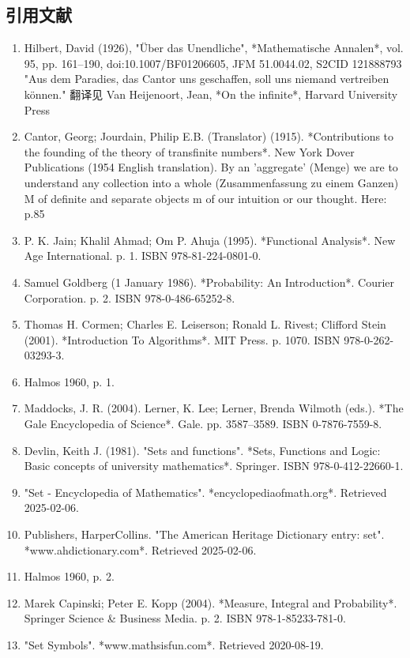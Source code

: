 \subsection{引用文献}
\begin{enumerate}
\item Hilbert, David (1926), "Über das Unendliche", *Mathematische Annalen*, vol. 95, pp. 161–190, doi:10.1007/BF01206605, JFM 51.0044.02, S2CID 121888793  
  "Aus dem Paradies, das Cantor uns geschaffen, soll uns niemand vertreiben können."  
  翻译见 Van Heijenoort, Jean, *On the infinite*, Harvard University Press
\item Cantor, Georg; Jourdain, Philip E.B. (Translator) (1915). *Contributions to the founding of the theory of transfinite numbers*. New York Dover Publications (1954 English translation). By an 'aggregate' (Menge) we are to understand any collection into a whole (Zusammenfassung zu einem Ganzen) M of definite and separate objects m of our intuition or our thought. Here: p.85  
\item P. K. Jain; Khalil Ahmad; Om P. Ahuja (1995). *Functional Analysis*. New Age International. p. 1. ISBN 978-81-224-0801-0.
\item Samuel Goldberg (1 January 1986). *Probability: An Introduction*. Courier Corporation. p. 2. ISBN 978-0-486-65252-8.  
\item Thomas H. Cormen; Charles E. Leiserson; Ronald L. Rivest; Clifford Stein (2001). *Introduction To Algorithms*. MIT Press. p. 1070. ISBN 978-0-262-03293-3.  
\item Halmos 1960, p. 1.  
\item Maddocks, J. R. (2004). Lerner, K. Lee; Lerner, Brenda Wilmoth (eds.). *The Gale Encyclopedia of Science*. Gale. pp. 3587–3589. ISBN 0-7876-7559-8.
\item Devlin, Keith J. (1981). "Sets and functions". *Sets, Functions and Logic: Basic concepts of university mathematics*. Springer. ISBN 978-0-412-22660-1.  
\item "Set - Encyclopedia of Mathematics". *encyclopediaofmath.org*. Retrieved 2025-02-06.  
\item Publishers, HarperCollins. "The American Heritage Dictionary entry: set". *www.ahdictionary.com*. Retrieved 2025-02-06.  
\item Halmos 1960, p. 2.  
\item Marek Capinski; Peter E. Kopp (2004). *Measure, Integral and Probability*. Springer Science & Business Media. p. 2. ISBN 978-1-85233-781-0.  
\item "Set Symbols". *www.mathsisfun.com*. Retrieved 2020-08-19.  

\end{enumerate}
